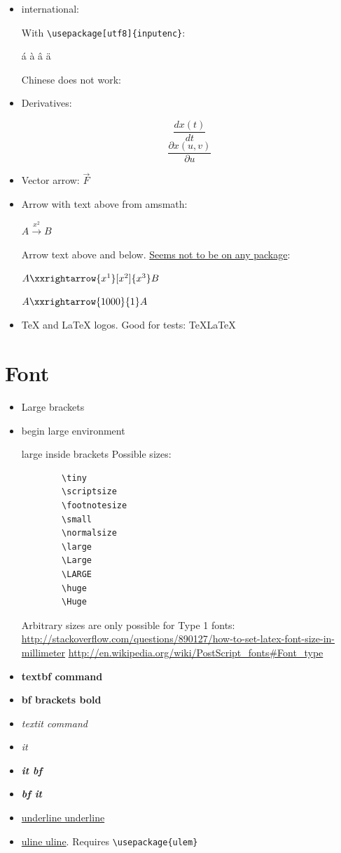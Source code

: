 \documentclass[12pt]{article}
\begin{document}
\begin{itemize}
    \item international:

      With \lstinline|\usepackage[utf8]{inputenc}|:

      á à â ä

      Chinese does not work: %

    \item Derivatives:

      $$ \frac{dx(t)}{dt} $$
      $$ \frac{\partial x(u,v)}{\partial u} $$

    \item Vector arrow: $\vec{F}$

    \item Arrow with text above from amsmath:

        $A\xrightarrow{x^2}B$

      Arrow text above and below. \href{http://tex.stackexchange.com/questions/27545/custom-length-arrows-text-over-and-under}{Seems not to be on any package}:

        $A\xxrightarrow{x^1}[x^2]{x^3}B$

        $A\xxrightarrow{1000}{1}A$

    \item TeX and LaTeX logos. Good for tests: \TeX \LaTeX
  \end{itemize}

\section{Font}\label{font}

  \begin{itemize}
    \item {\Large Large brackets}
    \item
      \begin{Large}begin large environment\end{Large}
      {\Large large inside brackets}
      Possible sizes:
      \begin{lstlisting}
        \tiny
        \scriptsize
        \footnotesize
        \small
        \normalsize
        \large
        \Large
        \LARGE
        \huge
        \Huge
      \end{lstlisting}

      Arbitrary sizes are only possible for Type 1 fonts: \url{http://stackoverflow.com/questions/890127/how-to-set-latex-font-size-in-millimeter}
      \url{http://en.wikipedia.org/wiki/PostScript_fonts#Font_type}
    \item \textbf{textbf command}
    \item {\bf bf brackets bold}
    \item \textit{textit command}
    \item {\it it}
    \item {\it \bf it bf}
    \item {\bf \it bf it}
    \item \underline{underline underline}
    \item \uline{uline uline}. Requires \lstinline|\usepackage{ulem}|
  \end{itemize}
\end{document}
